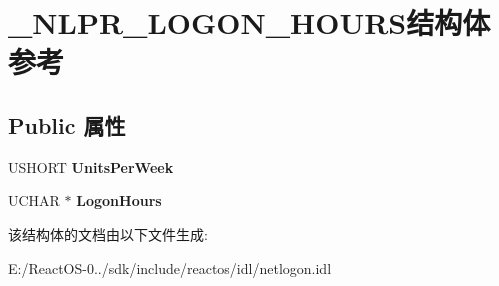 \hypertarget{struct___n_l_p_r___l_o_g_o_n___h_o_u_r_s}{}\section{\+\_\+\+N\+L\+P\+R\+\_\+\+L\+O\+G\+O\+N\+\_\+\+H\+O\+U\+R\+S结构体 参考}
\label{struct___n_l_p_r___l_o_g_o_n___h_o_u_r_s}
\subsection*{Public 属性}
\begin{DoxyCompactItemize}
\item 
\mbox{\label{struct___n_l_p_r___l_o_g_o_n___h_o_u_r_s_acee35dda1a02cc022a32128d6b816b52}} 
U\+S\+H\+O\+RT {\bfseries Units\+Per\+Week}
\item 
\mbox{\label{struct___n_l_p_r___l_o_g_o_n___h_o_u_r_s_ae1e65a6d7ef6a9534a386b2274267b11}} 
U\+C\+H\+AR $\ast$ {\bfseries Logon\+Hours}
\end{DoxyCompactItemize}


该结构体的文档由以下文件生成\+:\begin{DoxyCompactItemize}
\item 
E\+:/\+React\+O\+S-\/0../sdk/include/reactos/idl/netlogon.\+idl\end{DoxyCompactItemize}
